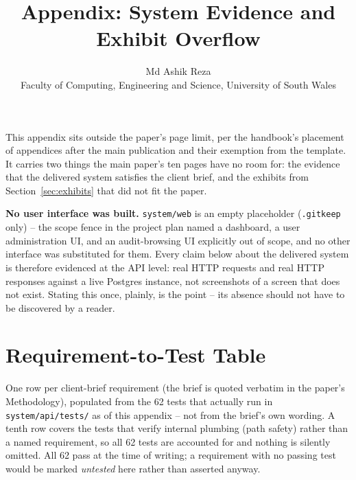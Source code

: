 \documentclass[11pt]{article}
\title{Appendix: System Evidence and Exhibit Overflow}
\author{Md Ashik Reza \\ Faculty of Computing, Engineering and Science, University of South Wales}
\date{}
\begin{document}
\maketitle

\noindent This appendix sits outside the paper's page limit, per the handbook's placement of
appendices after the main publication and their exemption from the template. It carries two
things the main paper's ten pages have no room for: the evidence that the delivered system
satisfies the client brief, and the exhibits from Section~\ref{sec:exhibits} that did not fit
the paper.

\textbf{No user interface was built.} \texttt{system/web} is an empty placeholder
(\texttt{.gitkeep} only) -- the scope fence in the project plan named a dashboard, a user
administration UI, and an audit-browsing UI explicitly out of scope, and no other interface was
substituted for them. Every claim below about the delivered system is therefore evidenced at the
API level: real HTTP requests and real HTTP responses against a live Postgres instance, not
screenshots of a screen that does not exist. Stating this once, plainly, is the point --
its absence should not have to be discovered by a reader.

\section{Requirement-to-Test Table}
\label{sec:req-test}

One row per client-brief requirement (the brief is quoted verbatim in the paper's Methodology),
populated from the 62 tests that actually run in \texttt{system/api/tests/} as of this
appendix -- not from the brief's own wording. A tenth row covers the tests that verify internal
plumbing (path safety) rather than a named requirement, so all 62 tests are accounted for and
nothing is silently omitted. All 62 pass at the time of writing; a requirement with no passing
test would be marked \emph{untested} here rather than asserted anyway.
\end{document}
